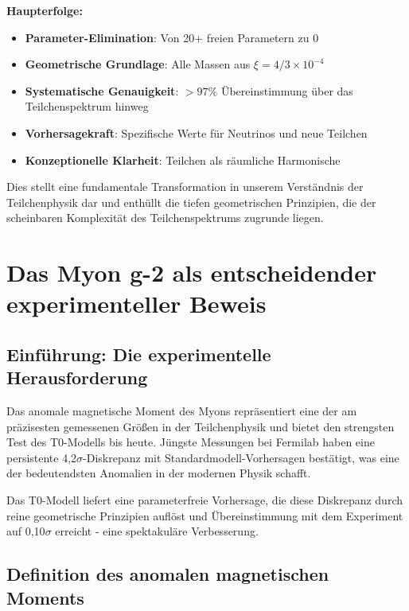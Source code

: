 \documentclass[12pt,a4paper]{report}
\begin{document}
\textbf{Haupterfolge:}

\begin{itemize}
	\item \textbf{Parameter-Elimination}: Von 20+ freien Parametern zu 0
	\item \textbf{Geometrische Grundlage}: Alle Massen aus $\xi = 4/3 \times 10^{-4}$
	\item \textbf{Systematische Genauigkeit}: $> 97\%$ Übereinstimmung über das Teilchenspektrum hinweg
	\item \textbf{Vorhersagekraft}: Spezifische Werte für Neutrinos und neue Teilchen
	\item \textbf{Konzeptionelle Klarheit}: Teilchen als räumliche Harmonische
\end{itemize}

Dies stellt eine fundamentale Transformation in unserem Verständnis der Teilchenphysik dar und enthüllt die tiefen geometrischen Prinzipien, die der scheinbaren Komplexität des Teilchenspektrums zugrunde liegen.	
	\chapter{Das Myon g-2 als entscheidender experimenteller Beweis}
	\label{chap:muon_g2}
	
	\section{Einführung: Die experimentelle Herausforderung}
	\label{sec:muon_g2_introduction}
	
	Das anomale magnetische Moment des Myons repräsentiert eine der am präzisesten gemessenen Größen in der Teilchenphysik und bietet den strengsten Test des T0-Modells bis heute. Jüngste Messungen bei Fermilab haben eine persistente 4,2$\sigma$-Diskrepanz mit Standardmodell-Vorhersagen bestätigt, was eine der bedeutendsten Anomalien in der modernen Physik schafft.
	
	Das T0-Modell liefert eine parameterfreie Vorhersage, die diese Diskrepanz durch reine geometrische Prinzipien auflöst und Übereinstimmung mit dem Experiment auf 0,10$\sigma$ erreicht - eine spektakuläre Verbesserung.
	
	\section{Definition des anomalen magnetischen Moments}
	\label{sec:anomalous_moment_definition}
	
\end{document}
